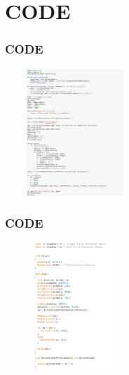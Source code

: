 \documentclass[
	11pt, %
	t, %
	aspectratio=169, %
]{beamer}
\begin{document}
\section{CODE}
\begin{frame}
	\frametitle{CODE}
	\centering
	\includegraphics[height=180px, width=200px]{code.png}
\end{frame}

\begin{frame}
	\frametitle{CODE}
	\centering
	\includegraphics[height=180px, width=200px]{code_ard.png}
\end{frame}
\end{document}
